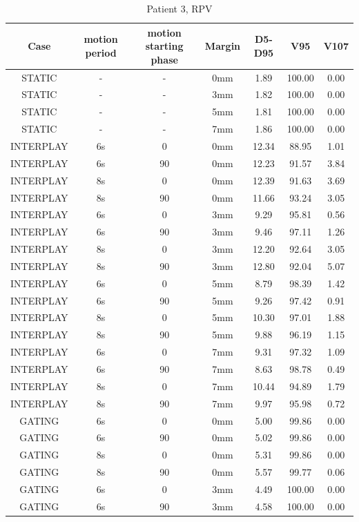 \documentclass[type=dr, dr=rernat, accentcolor=tud7b,colorbacktitle, bigchapter, openright, twoside, 12pt ]{tudthesis}
\begin{document}
\begin{table}[H]
  \centering
  \caption{Patient 3, RPV}
  \begin{tabular}{|c||c|c|c||c|c|c|}
    \hline\hline
    Case & motion period & motion starting phase & Margin & D5-D95 & V95 & V107\\
    \hline 
STATIC & - & - & 0mm & 1.89 & 100.00 & 0.00 \\
STATIC & - & - & 3mm & 1.82 & 100.00 & 0.00 \\
STATIC & - & - & 5mm & 1.81 & 100.00 & 0.00 \\
STATIC & - & - & 7mm & 1.86 & 100.00 & 0.00 \\
INTERPLAY & 6s & 0 & 0mm & 12.34 & 88.95 & 1.01 \\
INTERPLAY & 6s & 90 & 0mm & 12.23 & 91.57 & 3.84 \\
INTERPLAY & 8s & 0 & 0mm & 12.39 & 91.63 & 3.69 \\
INTERPLAY & 8s & 90 & 0mm & 11.66 & 93.24 & 3.05 \\
INTERPLAY & 6s & 0 & 3mm & 9.29 & 95.81 & 0.56 \\
INTERPLAY & 6s & 90 & 3mm & 9.46 & 97.11 & 1.26 \\
INTERPLAY & 8s & 0 & 3mm & 12.20 & 92.64 & 3.05 \\
INTERPLAY & 8s & 90 & 3mm & 12.80 & 92.04 & 5.07 \\
INTERPLAY & 6s & 0 & 5mm & 8.79 & 98.39 & 1.42 \\
INTERPLAY & 6s & 90 & 5mm & 9.26 & 97.42 & 0.91 \\
INTERPLAY & 8s & 0 & 5mm & 10.30 & 97.01 & 1.88 \\
INTERPLAY & 8s & 90 & 5mm & 9.88 & 96.19 & 1.15 \\
INTERPLAY & 6s & 0 & 7mm & 9.31 & 97.32 & 1.09 \\
INTERPLAY & 6s & 90 & 7mm & 8.63 & 98.78 & 0.49 \\
INTERPLAY & 8s & 0 & 7mm & 10.44 & 94.89 & 1.79 \\
INTERPLAY & 8s & 90 & 7mm & 9.97 & 95.98 & 0.72 \\
GATING & 6s & 0 & 0mm & 5.00 & 99.86 & 0.00 \\
GATING & 6s & 90 & 0mm & 5.02 & 99.86 & 0.00 \\
GATING & 8s & 0 & 0mm & 5.31 & 99.86 & 0.00 \\
GATING & 8s & 90 & 0mm & 5.57 & 99.77 & 0.06 \\
GATING & 6s & 0 & 3mm & 4.49 & 100.00 & 0.00 \\
GATING & 6s & 90 & 3mm & 4.58 & 100.00 & 0.00 \\

\end{tabular}
\end{table}
\end{document}
